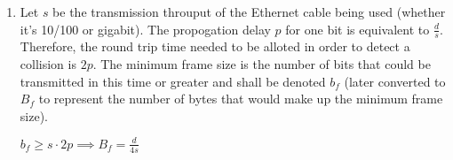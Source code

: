 \begin{enumerate}
    \newpage

    \item Let $s$ be the transmission throuput of the Ethernet cable being used (whether it's 10/100 or gigabit). The propogation delay $p$ for one bit is equivalent to $\frac{d}{s}$. Therefore, the round trip time needed to be alloted in order to detect a collision is $2p$. The minimum frame size is the number of bits that could be transmitted in this time or greater and shall be denoted $b_f$ (later converted to $B_f$ to represent the number of bytes that would make up the minimum frame size).
    \begin{center}
        $b_f  \geq s \cdot 2p \implies B_f = \frac{d}{4s}$
    \end{center}
\end{enumerate}


